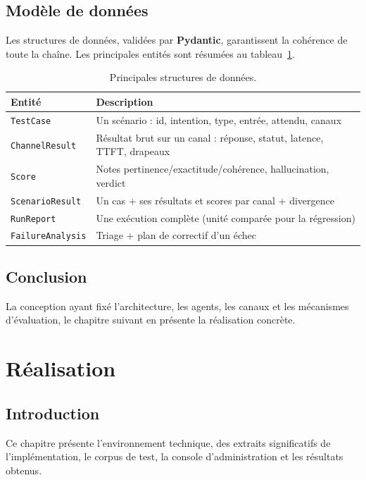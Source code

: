 \documentclass[12pt,a4paper,oneside]{report}
\begin{document}
\section{Modèle de données}
Les structures de données, validées par \textbf{Pydantic}, garantissent la cohérence de
toute la chaîne. Les principales entités sont résumées au tableau~\ref{tab:models}.

\begin{table}[H]
\centering
\caption{Principales structures de données.}
\label{tab:models}
\renewcommand{\arraystretch}{1.3}
\begin{tabularx}{\textwidth}{@{}l X@{}}
\toprule
\textbf{Entité} & \textbf{Description} \\
\midrule
\texttt{TestCase} & Un scénario : id, intention, type, entrée, attendu, canaux \\
\texttt{ChannelResult} & Résultat brut sur un canal : réponse, statut, latence, TTFT, drapeaux \\
\texttt{Score} & Notes pertinence/exactitude/cohérence, hallucination, verdict \\
\texttt{ScenarioResult} & Un cas + ses résultats et scores par canal + divergence \\
\texttt{RunReport} & Une exécution complète (unité comparée pour la régression) \\
\texttt{FailureAnalysis} & Triage + plan de correctif d'un échec \\
\bottomrule
\end{tabularx}
\end{table}

\section{Conclusion}
La conception ayant fixé l'architecture, les agents, les canaux et les mécanismes
d'évaluation, le chapitre suivant en présente la réalisation concrète.

\chapter{Réalisation}

\section{Introduction}
Ce chapitre présente l'environnement technique, des extraits significatifs de
l'implémentation, le corpus de test, la console d'administration et les résultats
obtenus.
\end{document}
